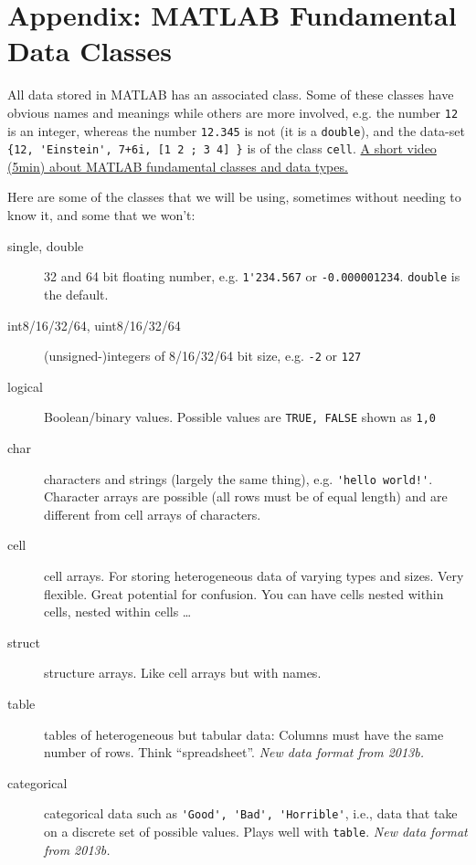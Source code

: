 \section{Appendix: MATLAB Fundamental Data Classes}
All data stored in MATLAB has an associated class.
Some of these classes have obvious names and meanings while others are more involved, e.g. the number \lstinline{12} is an integer, whereas the number \lstinline{12.345} is not (it is a \lstinline{double}), and the data-set 
\verb={12, 'Einstein', 7+6i, [1 2 ; 3 4] }= 
is of the class \lstinline{cell}.
\href{http://ch.mathworks.com/videos/introducing-matlab-fundamental-classes-data-types-101503.html}{A short video (5min) about MATLAB fundamental classes and data types.}

Here are some of the classes that we will be using, sometimes without needing to know it, and some that we won't:

\begin{description}
\item [single, double] 32 and 64 bit floating number, e.g. \lstinline{1'234.567} or \lstinline{-0.000001234}. \lstinline{double} is the default.
\item [int8/16/32/64, uint8/16/32/64] (unsigned-)integers of 8/16/32/64 bit size, e.g. \lstinline{-2} or \lstinline{127}
\item [logical] Boolean/binary values. Possible values are \lstinline{TRUE, FALSE} shown as \lstinline{1,0} 
\item [char] characters and strings (largely the same thing), e.g. \lstinline{'hello world!'}. Character arrays are possible (all rows must be of equal length) and are different from cell arrays of characters.
\item [cell] cell arrays. For storing heterogeneous data of varying types and sizes. Very flexible. Great potential for confusion. You can have cells nested within cells, nested within cells \ldots 
\item [struct] structure arrays. Like cell arrays but with names.
\item [table] tables of heterogeneous but tabular data: Columns must have the same number of rows. Think ``spreadsheet''. \emph{New data format from 2013b.}
\item [categorical] categorical data such as \lstinline{'Good', 'Bad', 'Horrible'}, i.e., data that take on a discrete set of possible values. Plays well with \lstinline{table}. \emph{New data format from 2013b.}

\end{description}

